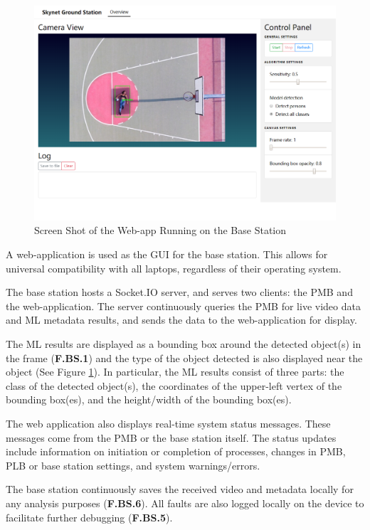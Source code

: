 \begin{figure}[H]
\begin{mdframed}
\centering
\includegraphics[width=15cm]{img/base_station.png}
\end{mdframed}
\caption{Screen Shot of the Web-app Running on the Base Station}
\label{basestationdiag}
\end{figure}

A web-application is used as the GUI for the base station. This allows for universal compatibility with all laptops, regardless of their operating system.

The base station hosts a Socket.IO server, and serves two clients: the PMB and the web-application. The server continuously queries the PMB for live video data and ML metadata results, and sends the data to the web-application for display.

The ML results are displayed as a bounding box around the detected object(s) in the frame (\textbf{F.BS.1}) and the type of the object detected is also displayed near the object (See Figure \ref{basestationdiag}). In particular, the ML results consist of three parts: the class of the detected object(s), the coordinates of the upper-left vertex of the bounding box(es), and the height/width of the bounding box(es).

The web application also displays real-time system status messages. These messages come from the PMB or the base station itself. The status updates include information on initiation or completion of processes, changes in PMB, PLB or base station settings, and system warnings/errors.

The base station continuously saves the received video and metadata locally for any analysis purposes (\textbf{F.BS.6}). All faults are also logged locally on the device to facilitate further debugging (\textbf{F.BS.5}).

